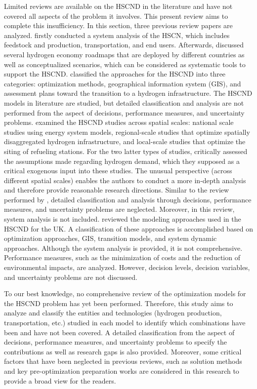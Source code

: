\documentclass[11pt,3p]{elsarticle}
\begin{document}
Limited reviews are available on the HSCND in the literature and have not covered all aspects of the problem it involves. This present review aims to complete this insufficiency. In this section, three previous review papers are analyzed. \citet{dagdougui2012models} firstly conducted a system analysis of the HSCN, which includes feedstock and production, transportation, and end users. Afterwards,  \citet{dagdougui2012models} discussed several hydrogen economy roadmaps that are deployed by different countries as well as conceptualized scenarios, which can be considered as systematic tools to support the HSCND. \citet{dagdougui2012models} classified the approaches for the HSCND into three categories: optimization methods, geographical information system (GIS), and assessment plans toward the transition to a hydrogen infrastructure. The HSCND models in literature are studied, but detailed classification and analysis are not performed from the aspect of decisions, performance measures, and uncertainty problems. \citet{agnolucci2013designing} examined the HSCND studies across spatial scales: national scale studies using energy system models, regional-scale studies that optimize spatially disaggregated hydrogen infrastructure, and local-scale studies that optimize the siting of refueling stations. For the two latter types of studies, \citet{agnolucci2013designing} critically assessed the assumptions made regarding hydrogen demand, which they supposed as a critical exogenous input into these studies. The unusual perspective (across different spatial scales) enables the authors to conduct a more in-depth analysis and therefore provide reasonable research directions. Similar to the review performed by \citet{dagdougui2012models}, detailed classification and analysis through decisions, performance measures, and uncertainty problems are neglected. Moreover, in this review, system analysis is not included. \citet{maryam2017review} reviewed the modeling approaches used in the HSCND for the UK. A classification of these approaches is accomplished based on optimization approaches, GIS, transition models, and system dynamic approaches. Although the system analysis is provided, it is not comprehensive. Performance measures, such as the minimization of costs and the reduction of environmental impacts, are analyzed. However, decision levels, decision variables, and uncertainty problems are not discussed.

To our best knowledge, no comprehensive review of the optimization models for the HSCND problem has yet been performed. Therefore, this study aims to analyze and classify the entities and technologies (hydrogen production, transportation, etc.) studied in each model to identify which combinations have been and have not been covered. A detailed classification from the aspect of decisions, performance measures, and uncertainty problems to specify the contributions as well as research gaps is also provided. Moreover, some critical factors that have been neglected in previous reviews, such as solution methods and key pre-optimization preparation works are considered in this research to provide a broad view for the readers.
\end{document}

